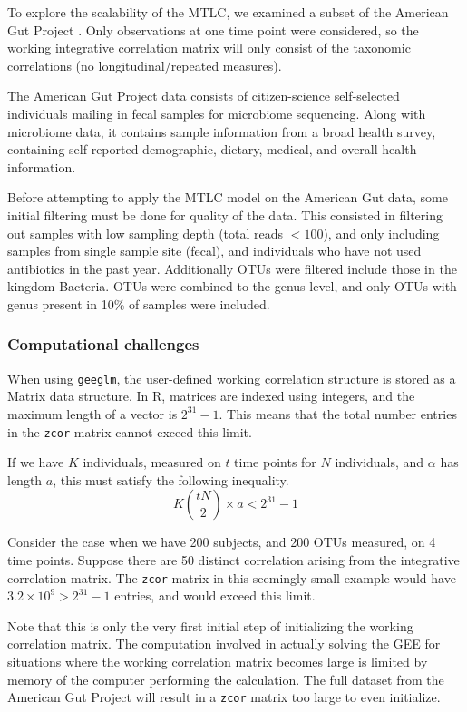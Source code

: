 \documentclass[12pt]{article}
\begin{document}
To explore the scalability of the MTLC, we examined a subset of the American Gut Project \cite{mayer2015gut}. Only observations at one time point were considered, so the working integrative correlation matrix will only consist of the taxonomic correlations (no longitudinal/repeated measures).

The American Gut Project data consists of citizen-science self-selected individuals mailing in fecal samples for microbiome sequencing. Along with microbiome data, it contains sample information from a broad health survey, containing self-reported demographic, dietary, medical, and overall health information.

Before attempting to apply the MTLC model on the American Gut data, some initial filtering must be done for quality of the data. This consisted in filtering out samples with low sampling depth (total reads $< 100$), and only including samples from single sample site (fecal), and individuals who have not used antibiotics in the past year. Additionally OTUs were filtered include those in the kingdom Bacteria. OTUs were combined to the genus level, and only OTUs with genus present in 10\% of samples were included.

\subsubsection{Computational challenges}

When using \texttt{geeglm}, the user-defined working correlation structure is stored as a Matrix data structure. In R, matrices are indexed using integers, and the maximum length of a vector is $2^{31}-1$. This means that the total number entries in the \texttt{zcor} matrix cannot exceed this limit.

If we have $K$ individuals, measured on $t$ time points for $N$ individuals, and $\alpha$ has length $a$, this must satisfy the following inequality.
$$ K \binom{tN}{2} \times a < 2^{31}-1$$

Consider the case when we have 200 subjects, and 200 OTUs measured, on 4 time points. Suppose there are 50 distinct correlation arising from the integrative correlation matrix. The \texttt{zcor} matrix in this seemingly small example would have $3.2 \times 10^9 > 2^{31}-1$ entries, and would exceed this limit.

Note that this is only the very first initial step of initializing the working correlation matrix. The computation involved in actually solving the GEE for situations where the working correlation matrix becomes large is limited by memory of the computer performing the calculation. The full dataset from the American Gut Project will result in a \texttt{zcor} matrix too large to even initialize.
\end{document}
